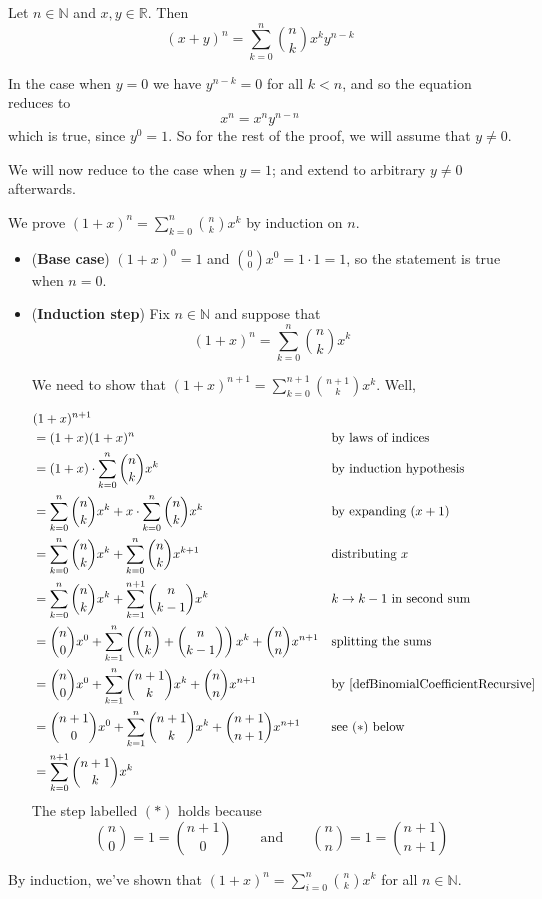 \begin{theorem}
\label{thmBinomialTheorem}
Let $n \in \mathbb{N}$ and $x,y \in \mathbb{R}$. Then
\[ (x+y)^n = \sum_{k=0}^n \binom{n}{k} x^k y^{n-k} \]
\end{theorem}
\begin{cproof}
In the case when $y=0$ we have $y^{n-k}=0$ for all $k<n$, and so the equation reduces to
\[ x^n = x^ny^{n-n} \]
which is true, since $y^0=1$. So for the rest of the proof, we will assume that $y \ne 0$.

We will now reduce to the case when $y=1$; and extend to arbitrary $y \ne 0$ afterwards.

We prove $(1+x)^n = \sum_{k=0}^n \binom{n}{k} x^k$ by induction on $n$.
\begin{itemize}
\item (\textbf{Base case}) $(1+x)^0=1$ and $\binom{0}{0} x^0 = 1 \cdot 1 = 1$, so the statement is true when $n=0$.
\item (\textbf{Induction step}) Fix $n \in \mathbb{N}$ and suppose that
\[ (1+x)^n = \sum_{k=0}^n \binom{n}{k} x^k \]

We need to show that $(1+x)^{n+1} = \sum_{k=0}^{n+1} \binom{n+1}{k} x^k$. Well,

\begin{align*} \hspace{-30pt}
& (1+x)^{n+1} && \\
&= (1+x)(1+x)^n && \text{by laws of indices} \\
&= (1+x) \cdot \sum_{k=0}^n \binom{n}{k} x^k && \text{by induction hypothesis} \\
&= \sum_{k=0}^n \binom{n}{k} x^k + x \cdot \sum_{k=0}^n \binom{n}{k} x^{k}&& \text{by expanding $(x+1)$} \\
&= \sum_{k=0}^n \binom{n}{k} x^k + \sum_{k=0}^n \binom{n}{k} x^{k+1} && \text{distributing $x$} \\
&= \sum_{k=0}^n \binom{n}{k} x^k + \sum_{k=1}^{n+1} \binom{n}{k-1} x^k && \text{$k \to k-1$ in second sum} \\
&= \binom{n}{0}x^0 + \sum_{k=1}^n \left( \binom{n}{k} + \binom{n}{k-1} \right) x^k + \binom{n}{n}x^{n+1} && \text{splitting the sums} \\
&= \binom{n}{0}x^0 + \sum_{k=1}^n \binom{n+1}{k} x^k + \binom{n}{n}x^{n+1} && \text{by \Cref{defBinomialCoefficientRecursive}} \\
&= \binom{n+1}{0}x^0 + \sum_{k=1}^n \binom{n+1}{k} x^k + \binom{n+1}{n+1}x^{n+1} && \text{see $(*)$ below} \\
&= \sum_{k=0}^{n+1} \binom{n+1}{k} x^k &&
\end{align*}
The step labelled $(*)$ holds because
\[ \binom{n}{0} = 1 = \binom{n+1}{0} \qquad \text{and} \qquad \binom{n}{n} = 1 = \binom{n+1}{n+1} \]
\end{itemize}
By induction, we've shown that $(1+x)^n = \sum_{i=0}^n \binom{n}{k} x^k$ for all $n \in \mathbb{N}$.


\end{cproof}
